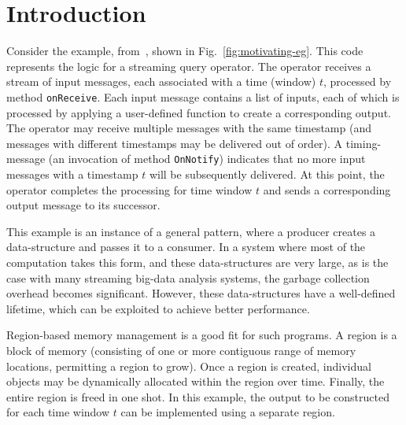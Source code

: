 \newcommand{\TODO}[1]{\textbf{TODO: #1}}
\newcommand{\eg}{\emph{e.g.}}
\newcommand{\ie}{\emph{i.e.}}

\section{Introduction}
\label{sec:introduction}

Consider the example, from~\cite{Broom:HotOS}, shown in Fig.~\ref{fig:motivating-eg}.
This code represents the logic for a streaming query operator.
The operator receives a stream of input messages, each associated
with a time (window) $t$, processed by method \texttt{onReceive}.
Each input message contains a list of inputs, each of which is processed
by applying a user-defined function to create a corresponding output.
The operator may receive multiple messages with the same timestamp
(and messages with different timestamps may be delivered out of order).
A timing-message (an invocation of method \texttt{OnNotify}) indicates that
no more input messages with a timestamp $t$ will be subsequently delivered.
At this point, the operator completes the processing for time window $t$ and sends
a corresponding output message to its successor.



This example is an instance of a general pattern, where a producer
creates a data-structure and passes it to a consumer.  In a system
where most of the computation takes this form, and these
data-structures are very large, as is the case with many streaming
big-data analysis systems, the garbage collection overhead becomes
significant.
However, these data-structures have a well-defined lifetime, which can
be exploited to achieve better performance.

Region-based memory management is a good fit for such programs.
A region is a block of memory (consisting of one or more contiguous
range of memory locations, permitting a region to grow).
Once a region is created, individual objects may be dynamically allocated within
the region over time. Finally, the entire region is freed in one shot.
In this example, the output to be constructed for each time window $t$ can be
implemented using a separate region.

